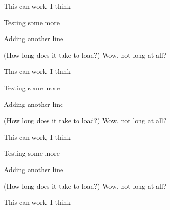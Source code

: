 \documentclass{article}
\begin{document}
This can work, I think

Testing some more

Adding another line

(How long does it take to load?)
Wow, not long at all?

This can work, I think

Testing some more

Adding another line

(How long does it take to load?)
Wow, not long at all?

This can work, I think

Testing some more

Adding another line

(How long does it take to load?)
Wow, not long at all?

This can work, I think
\end{document}
